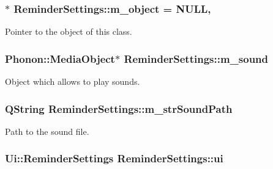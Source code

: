 \hypertarget{class_reminder_settings_adeaec35aa1f8a576bd8793d6e8eeaed3}{
\subsubsection[{m\-\_\-object}]{ $\ast$ Reminder\-Settings\-::m\-\_\-object = N\-U\-L\-L\hspace{0.3cm}{\ttfamily [static]}, {\ttfamily [private]}}}\label{class_reminder_settings_adeaec35aa1f8a576bd8793d6e8eeaed3}


Pointer to the object of this class. 

\hypertarget{class_reminder_settings_ac3cc26f8acada7bfc1b7a8cee3e2551c}{
\subsubsection[{m\-\_\-sound}]{\setlength{\rightskip}{0pt plus 5cm}Phonon\-::\-Media\-Object$\ast$ Reminder\-Settings\-::m\-\_\-sound\hspace{0.3cm}{\ttfamily [private]}}}\label{class_reminder_settings_ac3cc26f8acada7bfc1b7a8cee3e2551c}


Object which allows to play sounds. 

\hypertarget{class_reminder_settings_a3e4a8a906147325c9f299304d7b38c31}{
\subsubsection[{m\-\_\-str\-Sound\-Path}]{\setlength{\rightskip}{0pt plus 5cm}Q\-String Reminder\-Settings\-::m\-\_\-str\-Sound\-Path\hspace{0.3cm}{\ttfamily [private]}}}\label{class_reminder_settings_a3e4a8a906147325c9f299304d7b38c31}


Path to the sound file. 

\hypertarget{class_reminder_settings_a8cb71405093ce262c5568ee0ee1f5365}{
\subsubsection[{ui}]{\setlength{\rightskip}{0pt plus 5cm}Ui\-::\-Reminder\-Settings Reminder\-Settings\-::ui\hspace{0.3cm}{\ttfamily [private]}}}\label{class_reminder_settings_a8cb71405093ce262c5568ee0ee1f5365}


